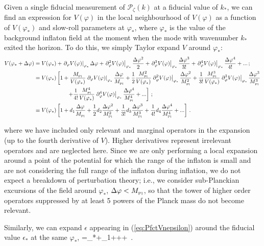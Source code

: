 \documentclass[useAMS,usenatbib,a4paper,onecolumn]{mn2e}
\begin{document}
Given a single fiducial measurement of $\mathcal{P}_\zeta(k)$ at a fiducial value of $k_*$, we can find an expression for $V(\varphi)$ in the local neighbourhood of $V(\varphi)$ as a function of $V(\varphi_*)$ and slow-roll parameters at $\varphi_*$, where $\varphi_*$ is the value of the background inflaton field at the moment when the mode with wavenumber $k_*$ exited the horizon. To do this, we simply Taylor expand $V$ around $\varphi_*$:
\begin{align}
	V(\varphi_*+\Delta\varphi)&=V(\varphi_*)+\left.\partial_\varphi V(\varphi)\right|_{\varphi_*}\Delta\varphi+\left.\partial^2_\varphi V(\varphi)\right|_{\varphi_*}\frac{\Delta\varphi^2}{2}+\left.\partial^3_\varphi V(\varphi)\right|_{\varphi_*}\frac{\Delta\varphi^3}{3!}+\left.\partial^4_\varphi V(\varphi)\right|_{\varphi_*}\frac{\Delta\varphi^4}{4!}+...\, ;\\
	&=V(\varphi_*)\left[1+\frac{M_{_\mathrm{Pl}}}{V(\varphi_*)}\left.\partial_\varphi V(\varphi)\right|_{\varphi_*}\frac{\Delta\varphi}{M_{_\mathrm{Pl}}}+\frac{1}{2}\frac{M_{_\mathrm{Pl}}^2}{V(\varphi_*)}\left.\partial^2_\varphi V(\varphi)\right|_{\varphi_*}\frac{\Delta\varphi^2}{M_{_\mathrm{Pl}}^2}+\frac{1}{3!}\frac{M_{_\mathrm{Pl}}^3}{V(\varphi_*)}\left.\partial^3_\varphi V(\varphi)\right|_{\varphi_*}\frac{\Delta\varphi^3}{M_{_\mathrm{Pl}}^3}\right. \nonumber\\
	&\qquad\qquad\qquad\left.+\frac{1}{4!}\frac{M_{_\mathrm{Pl}}^4}{V(\varphi_*)}\left.\partial^4_\varphi V(\varphi)\right|_{\varphi_*}\frac{\Delta\varphi^4}{M_{_\mathrm{Pl}}^4}+...\right]\, ;\\
	&\equiv V(\varphi_*)\left[1+d_1\frac{\Delta\varphi}{M_{_\mathrm{Pl}}}+\frac{1}{2}d_2\frac{\Delta\varphi^2}{M_{_\mathrm{Pl}}^2}+\frac{1}{3!}d_3\frac{\Delta\varphi^3}{M_{_\mathrm{Pl}}^3} +\frac{1}{4!}d_4\frac{\Delta\varphi^4}{M_{_\mathrm{Pl}}^4}+...\right]\,.
\end{align}

where we have included only relevant and marginal operators in the expansion (up to the fourth derivative of $V$). Higher derivatives represent irrelevant operators and are neglected here. Since we are only performing a local expansion around a point of the potential for which the range of the inflaton is small and are not considering the full range of the inflaton during inflation, we do not expect a breakdown of perturbation theory; i.e., we consider sub-Planckian excursions of the field around $\varphi_*$, $\Delta\varphi<M_{_\mathrm{Pl}}$, so that the tower of higher order operators suppressed by at least 5 powers of the Planck mass do not become relevant.

Similarly, we can expand $\epsilon$ appearing in (\ref{eq:PfctVnepsilon}) around the fiducial value $\epsilon_*$ at the same $\varphi_*$,
\be
	\epsilon=\epsilon_*+\Gamma_1\frac{\Delta\varphi}{\Mp}+++\, .
\ee
\end{document}
